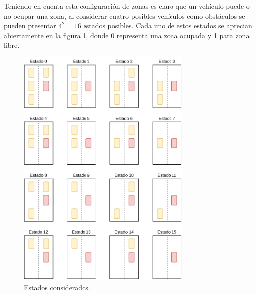 Teniendo en cuenta esta configuración de zonas es claro que un vehículo puede o no ocupar una zona, al considerar cuatro posibles vehículos como obstáculos se pueden presentar $4^2 = 16$ estados posibles. Cada uno de estos estados se aprecian abiertamente en la figura \ref{fig:states}, donde 0 representa una zona ocupada y 1 para zona libre.
\newpage
\begin{figure}[h]
    \centering
    \includegraphics[width=0.75\textwidth]{Figures/Figures_Cap06/states.pdf}
    \caption{Estados considerados.}
    \label{fig:states}
\end{figure}

